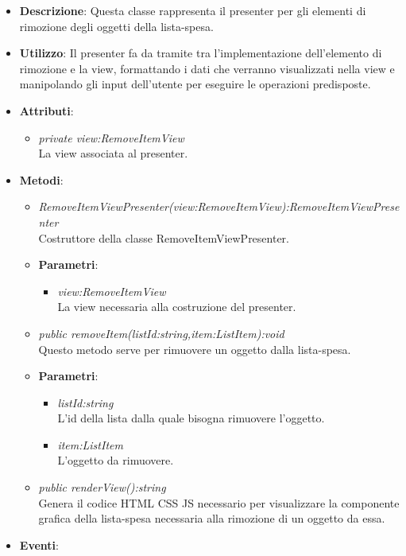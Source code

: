 \begin{itemize}
\item \textbf{Descrizione}: Questa classe rappresenta il presenter per gli elementi di rimozione degli oggetti  della lista-spesa.
\item \textbf{Utilizzo}: Il presenter fa da tramite tra l'implementazione dell'elemento di rimozione e la view, formattando i dati che verranno visualizzati nella view e manipolando gli input dell'utente per eseguire le operazioni predisposte.
\item \textbf{Attributi}: 
	\begin{itemize}
	\item \textit{private view:RemoveItemView}\\
	La view associata al presenter.
	\end{itemize}
\item \textbf{Metodi}:
	\begin{itemize}
	\item \textit{RemoveItemViewPresenter(view:RemoveItemView):RemoveItemViewPresenter}\\
	Costruttore della classe RemoveItemViewPresenter.
			\item{\textbf{Parametri}: \begin{itemize}
			\item \textit{view:RemoveItemView}\\
			La view necessaria alla costruzione del presenter.
			\end{itemize}}
	\item \textit{public removeItem(listId:string,item:ListItem):void}\\
	Questo metodo serve per rimuovere un oggetto dalla lista-spesa.
			\item{\textbf{Parametri}: \begin{itemize}
			\item \textit{listId:string}\\
			L'id della lista dalla quale bisogna rimuovere l'oggetto.
			\item \textit{item:ListItem}\\
			L'oggetto da rimuovere.
			\end{itemize}}
	\item \textit{public renderView():string}\\
	Genera il codice HTML CSS JS necessario per visualizzare la componente grafica della lista-spesa necessaria alla rimozione di un oggetto da essa.
	\end{itemize}
\item \textbf{Eventi}:
\end{itemize}

